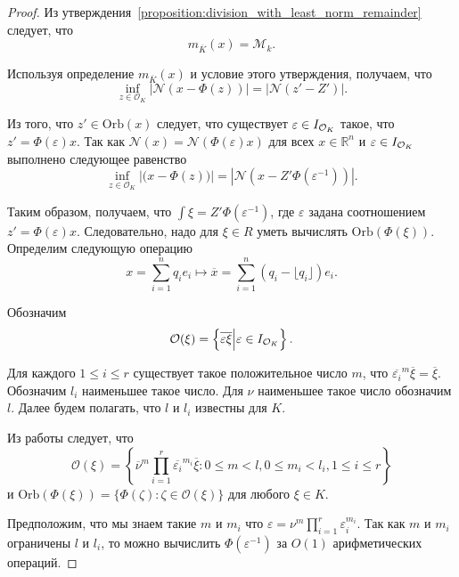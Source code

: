 \documentclass[_00_dissertation.tex]{subfiles}
\begin{document}
\begin{proof}
    Из утверждения~\ref{proposition:division_with_least_norm_remainder} следует, что
    \begin{equation*}
        m_{\overline{K}}(x) = \mathcal{M}_k.
    \end{equation*}
    
    Используя определение $m_{\overline{K}}(x)$ и условие этого утверждения, получаем, что
    \begin{equation*}
        \inf\limits_{z \in \mathcal{O}_K} |\mathcal{N}(x - \Phi(z))| = |\mathcal{N}(z' - Z')|.
    \end{equation*}

    Из того, что $z' \in \textrm{Orb}(x)$ следует, что существует $\varepsilon \in I_{\mathcal{O}_K}$ такое, что $z' = \Phi(\varepsilon)x$.
    Так как $\mathcal{N}(x) = \mathcal{N}(\Phi(\varepsilon)x)$ для всех $x \in \mathbb{R}^n$ и $\varepsilon \in I_{\mathcal{O}_K}$ выполнено следующее равенство
    \begin{equation*}
        \inf\limits_{z \in \mathcal{O}_K} |\mathcal(x - \Phi(z))| = |\mathcal{N}(x - Z'\Phi(\varepsilon^{-1}))|.
    \end{equation*}

    Таким образом, получаем, что $\int{\xi} = Z'\Phi(\varepsilon^{-1})$, где $\varepsilon$ задана соотношением $z' = \Phi(\varepsilon)x$.
    Следовательно, надо для $\xi \in R$ уметь вычислять $\textrm{Orb}(\Phi(\xi))$.
    Определим следующую операцию
    \begin{equation*}
        x = \sum\limits_{i=1}^n q_i e_i \longmapsto \overline{x} = \sum\limits_{i=1}^n (q_i - \lfloor q_i \rfloor)e_i.
    \end{equation*}
    
    Обозначим
    \begin{equation*}
        \mathcal{O}(\xi) = \left\{
            \overline{\varepsilon\xi} \Big| \varepsilon \in I_{\mathcal{O}_K}
    	\right\}.
    \end{equation*}
    
    Для каждого $1 \le i \le r$ существует такое положительное число $m$, что $\overline{\varepsilon_i}^m\overline{\xi} = \overline{\xi}$.
    Обозначим $l_i$ наименьшее такое число.
    Для $\nu$ наименьшее такое число обозначим $l$.
    Далее будем полагать, что $l$ и $l_i$ известны для $K$.
    
    Из работы \cite[с.~1413]{source:Lezowski} следует, что
    \begin{equation*}
        \mathcal{O}(\xi) = \left\{
            \overline{\nu}^m \prod\limits_{i=1}^r \overline{\varepsilon_i}^{m_i} \overline{\xi}:
                0 \le m < l, 0 \le m_i < l_i, 1 \le i \le r
        \right\}
    \end{equation*}
    и $\textrm{Orb}(\Phi(\xi)) = \{\Phi(\zeta):\zeta \in \mathcal{O}(\xi)\}$ для любого $\xi\in K$.

    Предположим, что мы знаем такие $m$ и $m_i$ что $\varepsilon = \nu^m\prod_{i=1}^r \varepsilon_i^{m_i}$.
    Так как $m$ и $m_i$ ограничены $l$ и $l_i$, то можно вычислить $\Phi(\varepsilon^{-1})$ за $O(1)$ арифметических операций.
\end{proof}
\end{document}
